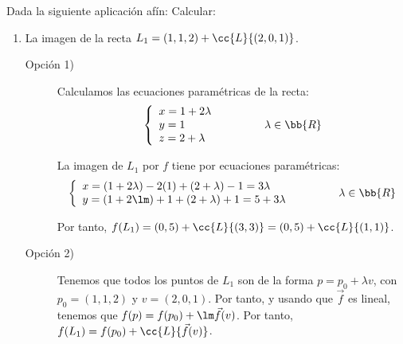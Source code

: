 \begin{ejercicio}
    Dada la siguiente aplicación afín:
    Calcular:
    \begin{enumerate}
        \item La imagen de la recta $L_1 = (1, 1, 2) + \cc{L}\{(2, 0, 1)\}$.

        \begin{description}
            \item[Opción 1)]
            Calculamos las ecuaciones paramétricas de la recta:
            \begin{equation*}
                \left\{
                \begin{array}{l}
                    x = 1+2\lambda\\
                    y=1\\
                    z=2+\lambda
                \end{array}
                \right. \qquad\qquad \lambda\in \bb{R}
            \end{equation*}
    
            La imagen de $L_1$ por $f$ tiene por ecuaciones paramétricas:
            \begin{equation*}
                \left\{
                \begin{array}{l}
                    x = (1+2\lambda)-2(1)+(2+\lambda)-1 = 3\lambda\\
                    y= (1+2\lm) + 1 + (2+\lambda) +1=5+3\lambda
                \end{array}
                \right. \qquad\qquad \lambda\in \bb{R}
            \end{equation*}

            Por tanto, $f(L_1)=(0,5)+\cc{L}\{(3,3)\}=(0,5)+\cc{L}\{(1,1)\}$.

            \item[Opción 2)] Tenemos que todos los puntos de $L_1$ son de la forma $p=p_0+\lambda v$, con $p_0=(1,1,2)$ y $v=(2,0,1)$. Por tanto, y usando que $\vec{f}$ es lineal, tenemos que $f(p)=f(p_0)+\lm \vec{f}(v)$. Por tanto, $f(L_1)=f(p_0)+\cc{L}\{\vec{f}(v)\}$.


\end{description}
\end{enumerate}
\end{ejercicio}
